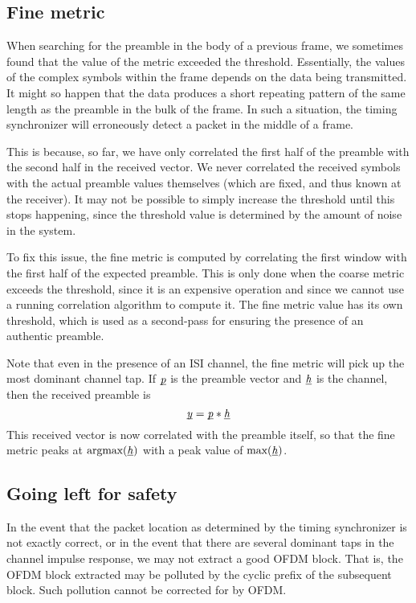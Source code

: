 
\subsection{Fine metric}
\label{subsec:fine-metric}

When searching for the preamble in the body of a previous frame, we sometimes
found that the value of the metric exceeded the threshold. Essentially, the
values of the complex symbols within the frame depends on the data being
transmitted. It might so happen that the data produces a short repeating
pattern of the same length as the preamble in the bulk of the frame. In such a
situation, the timing synchronizer will erroneously detect a packet in the
middle of a frame.

This is because, so far, we have only correlated the first half of the preamble
with the second half in the received vector. We never correlated the received
symbols with the actual preamble values themselves (which are fixed, and thus
known at the receiver). It may not be possible to simply increase the threshold
until this stops happening, since the threshold value is determined by the
amount of noise in the system. %

To fix this issue, the fine metric is computed by correlating the first window
with the first half of the expected preamble. This is only done when the coarse
metric exceeds the threshold, since it is an expensive operation and since we
cannot use a running correlation algorithm to compute it. The fine metric value
has its own threshold, which is used as a second-pass for ensuring the presence
of an authentic preamble.

Note that even in the presence of an ISI channel, the fine metric will pick up
the most dominant channel tap. If $\underbar{\emph{p}}$ is the preamble vector and $\underbar{\emph{h}}$
is the channel, then the received preamble is
$$\underbar{\emph{y}} = \underbar{\emph{p}} * \underbar{\emph{h}}$$
This received vector is now correlated with the preamble itself, so that the
fine metric peaks at $\text{argmax}(\underbar{\emph{h}})$ with a peak value of
$\text{max}(\underbar{\emph{h}})$.


\subsection{Going left for safety}
\label{subsec:safety}

In the event that the packet location as determined by the timing synchronizer
is not exactly correct, or in the event that there are several dominant taps
in the channel impulse response, we may not extract a good OFDM block. That is,
the OFDM block extracted may be polluted by the cyclic prefix of the subsequent
block. Such pollution cannot be corrected for by OFDM.

